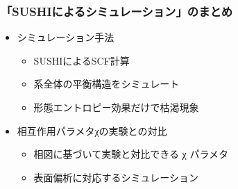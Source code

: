 \documentclass[unicode,12pt]{beamer}%
\begin{document}
\begin{frame}
	\frametitle{「SUSHIによるシミュレーション」のまとめ}
        \begin{boxnote}
            \vspace{-3mm}
            \begin{itemize}
                \item シミュレーション手法
                    \begin{itemize}
						\item SUSHIによるSCF計算
						\item 系全体の平衡構造をシミュレート
                        \item 形態エントロピー効果だけで枯渇現象
                    \end{itemize} 
                \item 相互作用パラメタχの実験との対比
                    \begin{itemize}
                        \item 相図に基づいて実験と対比できる χ パラメタ
                        \item 表面偏析に対応するシミュレーション
                    \end{itemize} 
            \end{itemize}
        \end{boxnote}
\end{frame}
\end{document}
